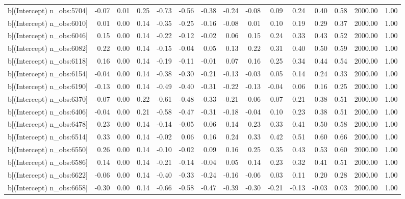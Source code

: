 \begin{table}[ht]
\begin{tabular}{rrrrrrrrrrrrrrr}
  b[(Intercept) n\_obs:5704] & -0.07 & 0.01 & 0.25 & -0.73 & -0.56 & -0.38 & -0.24 & -0.08 & 0.09 & 0.24 & 0.40 & 0.58 & 2000.00 & 1.00 \\ 
  b[(Intercept) n\_obs:6010] & 0.01 & 0.00 & 0.14 & -0.35 & -0.25 & -0.16 & -0.08 & 0.01 & 0.10 & 0.19 & 0.29 & 0.37 & 2000.00 & 1.00 \\ 
  b[(Intercept) n\_obs:6046] & 0.15 & 0.00 & 0.14 & -0.22 & -0.12 & -0.02 & 0.06 & 0.15 & 0.24 & 0.33 & 0.43 & 0.52 & 2000.00 & 1.00 \\ 
  b[(Intercept) n\_obs:6082] & 0.22 & 0.00 & 0.14 & -0.15 & -0.04 & 0.05 & 0.13 & 0.22 & 0.31 & 0.40 & 0.50 & 0.59 & 2000.00 & 1.00 \\ 
  b[(Intercept) n\_obs:6118] & 0.16 & 0.00 & 0.14 & -0.19 & -0.11 & -0.01 & 0.07 & 0.16 & 0.25 & 0.34 & 0.44 & 0.54 & 2000.00 & 1.00 \\ 
  b[(Intercept) n\_obs:6154] & -0.04 & 0.00 & 0.14 & -0.38 & -0.30 & -0.21 & -0.13 & -0.03 & 0.05 & 0.14 & 0.24 & 0.33 & 2000.00 & 1.00 \\ 
  b[(Intercept) n\_obs:6190] & -0.13 & 0.00 & 0.14 & -0.49 & -0.40 & -0.31 & -0.22 & -0.13 & -0.04 & 0.06 & 0.16 & 0.25 & 2000.00 & 1.00 \\ 
  b[(Intercept) n\_obs:6370] & -0.07 & 0.00 & 0.22 & -0.61 & -0.48 & -0.33 & -0.21 & -0.06 & 0.07 & 0.21 & 0.38 & 0.51 & 2000.00 & 1.00 \\ 
  b[(Intercept) n\_obs:6406] & -0.04 & 0.00 & 0.21 & -0.58 & -0.47 & -0.31 & -0.18 & -0.04 & 0.10 & 0.23 & 0.38 & 0.51 & 2000.00 & 1.00 \\ 
  b[(Intercept) n\_obs:6478] & 0.23 & 0.00 & 0.14 & -0.14 & -0.05 & 0.06 & 0.14 & 0.23 & 0.33 & 0.41 & 0.50 & 0.58 & 2000.00 & 1.00 \\ 
  b[(Intercept) n\_obs:6514] & 0.33 & 0.00 & 0.14 & -0.02 & 0.06 & 0.16 & 0.24 & 0.33 & 0.42 & 0.51 & 0.60 & 0.66 & 2000.00 & 1.00 \\ 
  b[(Intercept) n\_obs:6550] & 0.26 & 0.00 & 0.14 & -0.10 & -0.02 & 0.09 & 0.16 & 0.25 & 0.35 & 0.43 & 0.53 & 0.60 & 2000.00 & 1.00 \\ 
  b[(Intercept) n\_obs:6586] & 0.14 & 0.00 & 0.14 & -0.21 & -0.14 & -0.04 & 0.05 & 0.14 & 0.23 & 0.32 & 0.41 & 0.51 & 2000.00 & 1.00 \\ 
  b[(Intercept) n\_obs:6622] & -0.06 & 0.00 & 0.14 & -0.40 & -0.33 & -0.24 & -0.16 & -0.06 & 0.03 & 0.11 & 0.20 & 0.28 & 2000.00 & 1.00 \\ 
  b[(Intercept) n\_obs:6658] & -0.30 & 0.00 & 0.14 & -0.66 & -0.58 & -0.47 & -0.39 & -0.30 & -0.21 & -0.13 & -0.03 & 0.03 & 2000.00 & 1.00 \\ 

\end{tabular}
\end{table}
